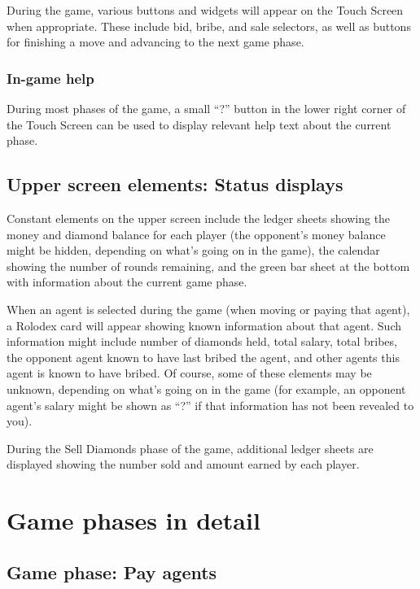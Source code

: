 \documentclass[8pt]{extbook}
\begin{document}
During the game, various buttons and widgets will appear on the Touch Screen when appropriate.  These include bid, bribe, and sale selectors, as well as buttons for finishing a move and advancing to the next game phase.

\subsubsection{In-game help}

During most phases of the game, a small ``?'' button in the lower right corner of the Touch Screen can be used to display relevant help text about the current phase.

\subsection{Upper screen elements:  Status displays}

Constant elements on the upper screen include the ledger sheets showing the money and diamond balance for each player (the opponent's money balance might be hidden, depending on what's going on in the game), the calendar showing the number of rounds remaining, and the green bar sheet at the bottom with information about the current game phase.

When an agent is selected during the game (when moving or paying that agent), a Rolodex card will appear showing known information about that agent.  Such information might include number of diamonds held, total salary, total bribes, the opponent agent known to have last bribed the agent, and other agents this agent is known to have bribed.  Of course, some of these elements may be unknown, depending on what's going on in the game (for example, an opponent agent's salary might be shown as ``?'' if that information has not been revealed to you).

During the Sell Diamonds phase of the game, additional ledger sheets are displayed showing the number sold and amount earned by each player.





\section{Game phases in detail}

\subsection{Game phase:  Pay agents}
\label{sec:payPhase}
\end{document}
